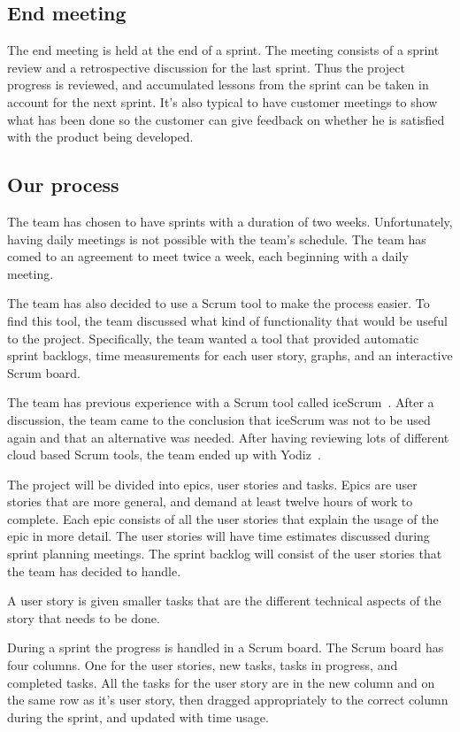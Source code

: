\subsection{End meeting}
The end meeting is held at the end of a sprint. The meeting consists of a sprint review and a retrospective discussion 
for the last sprint.
Thus the project progress is reviewed, and accumulated lessons from the sprint can be taken in account for the
next sprint.
It's also typical to have customer meetings to show what has been done so the customer can give feedback on 
whether he is satisfied with the product being developed.

\subsection{Our process}
The team has chosen to have sprints with a duration of two weeks. Unfortunately, having daily meetings is not 
possible with the team's schedule. The team has comed to an agreement to meet twice a week, each beginning with a daily meeting.

The team has also decided to use a Scrum tool to make the process easier.
To find this tool, the team discussed what kind of functionality that would be useful to the project. 
Specifically, the team wanted a tool that provided automatic sprint backlogs, time measurements for each user story, 
graphs, and an interactive Scrum board.

The team has previous experience with a Scrum tool called iceScrum~\cite{icescrum}. After a discussion, the team came to the conclusion 
that iceScrum was not to be used again and that an alternative was needed.
After having reviewing lots of different cloud based Scrum tools, the team ended up with Yodiz~\cite{yodiz}.

The project will be divided into epics, user stories and tasks. Epics are user stories that are more general, 
and demand at least twelve hours of work to complete. Each epic consists
of all the user stories that explain the usage of the epic in more detail.
The user stories will have time estimates discussed during sprint planning meetings.
The sprint backlog will consist of the user stories that the team has decided to handle.

A user story is given smaller tasks that are the different technical aspects of the story that needs to be done.

During a sprint the progress is handled in a Scrum board. The Scrum board has four columns. One for the user stories, new tasks, tasks in progress, and completed tasks.
All the tasks for the user story are in the new column and on the same row as it's user story, then dragged appropriately to the correct column during the sprint, and updated with time usage.
